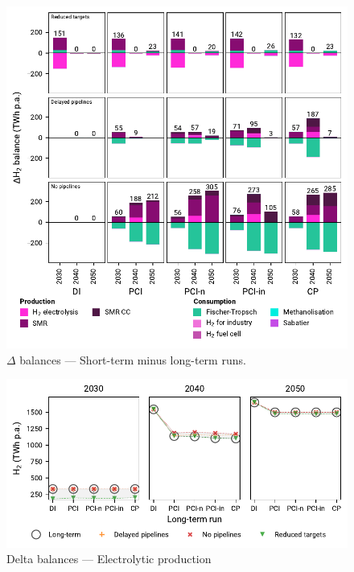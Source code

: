 \documentclass[preprint,12pt,sort&compress]{elsarticle}
\begin{document}
\begin{figure}[htbp]
  \centering
  \includegraphics[width=\textwidth]{balances_overview_extended_H2}
  \caption{$\Delta$ balances --- Short-term minus long-term runs.}
  \label{fig:balances_overview_extended_H2_stored}
\end{figure}

\begin{figure}[htbp]
  \centering
  \includegraphics[width=\textwidth]{delta_balances_H2 Electrolysis}
  \caption{Delta balances --- Electrolytic  production}
  \label{fig:delta_balances_h2_electrolysis}
\end{figure}
\end{document}
